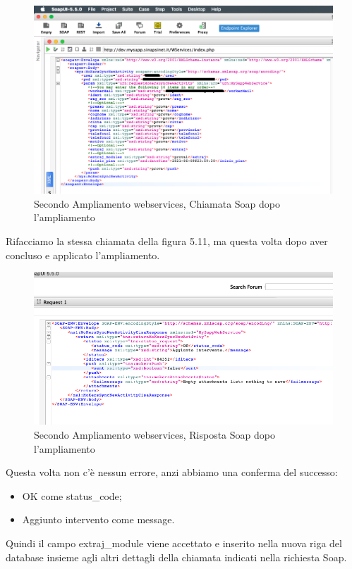 \begin{figure}[!h] 
	\centering
	\includegraphics[scale = 0.5]{immagini/webservices/ampliamenti/accettazione/2ampl_soap_chiamata_premodifica.png}
	\caption{Secondo Ampliamento webservices, Chiamata Soap dopo l'ampliamento}
\end{figure}

\begin{flushleft}
	Rifacciamo la stessa chiamata della figura 5.11, ma questa volta dopo aver concluso e applicato l'ampliamento.
\end{flushleft}

\begin{figure}[!h] 
	\centering
	\includegraphics[scale = 0.5]{immagini/webservices/ampliamenti/accettazione/2ampl_soap_risposta_postmodifica.png}
	\caption{Secondo Ampliamento webservices, Risposta Soap dopo l'ampliamento}
\end{figure}
\begin{flushleft}
	Questa volta non c'è nessun errore, anzi abbiamo una conferma del successo:
	\begin{itemize}
		\item OK come status\_code;
		\item Aggiunto intervento come message.
	\end{itemize}
	
	Quindi il campo extraj\_module viene accettato e inserito nella nuova riga del database insieme agli altri dettagli della chiamata indicati nella richiesta Soap.
\end{flushleft}
\newpage

